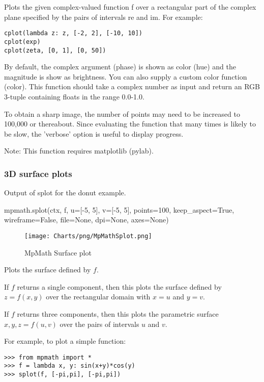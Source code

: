 \vpara
Plots the given complex-valued function f over a rectangular part of the complex plane specified by the pairs of intervals re and im. For example:

\begin{lstlisting}
cplot(lambda z: z, [-2, 2], [-10, 10])
cplot(exp)
cplot(zeta, [0, 1], [0, 50])
\end{lstlisting}


By default, the complex argument (phase) is shown as color (hue) and the magnitude is show as brightness. You can also supply a custom color function (color). This function should take a complex number as input and return an RGB 3-tuple containing floats in the range 0.0-1.0.

\vpara
To obtain a sharp image, the number of points may need to be increased to 100,000 or thereabout. Since evaluating the function that many times is likely to be slow, the 'verbose' option is useful to display progress.

Note: This function requires matplotlib (pylab).


\newpage
\subsubsection{3D surface plots}


Output of splot for the donut example.

\vpara
mpmath.splot(ctx, f, u=[-5, 5], v=[-5, 5], points=100, keep\_aspect=True, wireframe=False, file=None, dpi=None, axes=None)

\begin{figure}[ht]
	\centering
	\texttt{[image: Charts/png/MpMathSplot.png]}
	\caption{MpMath Surface plot}
	\label{Fig MpMath Surface plot}
\end{figure}


Plots the surface defined by $f$.

\vpara
If $f$ returns a single component, then this plots the surface defined by $z=f(x,y)$ over the rectangular domain with $x=u$  and $y=v$.

\vpara
If $f$ returns three components, then this plots the parametric surface $x,y,z = f(u,v)$ over the pairs of intervals $u$ and $v$.

\vpara
For example, to plot a simple function:

\begin{lstlisting}
>>> from mpmath import *
>>> f = lambda x, y: sin(x+y)*cos(y)
>>> splot(f, [-pi,pi], [-pi,pi])
\end{lstlisting}


